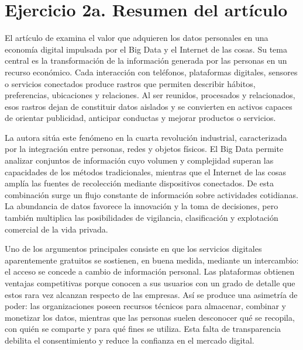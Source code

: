 
\section*{Ejercicio 2a. Resumen del artículo}

El artículo de \citet{datavalue} examina el valor que adquieren los datos
personales en una economía digital impulsada por el Big Data y el Internet de
las cosas. Su tema central es la transformación de la información generada por
las personas en un recurso económico. Cada interacción con teléfonos,
plataformas digitales, sensores o servicios conectados produce rastros que
permiten describir hábitos, preferencias, ubicaciones y relaciones. Al ser
reunidos, procesados y relacionados, esos rastros dejan de constituir datos
aislados y se convierten en activos capaces de orientar publicidad, anticipar
conductas y mejorar productos o servicios.

La autora sitúa este fenómeno en la cuarta revolución industrial, caracterizada
por la integración entre personas, redes y objetos físicos. El Big Data permite
analizar conjuntos de información cuyo volumen y complejidad superan las
capacidades de los métodos tradicionales, mientras que el Internet de las cosas
amplía las fuentes de recolección mediante dispositivos conectados. De esta
combinación surge un flujo constante de información sobre actividades
cotidianas. La abundancia de datos favorece la innovación y la toma de
decisiones, pero también multiplica las posibilidades de vigilancia,
clasificación y explotación comercial de la vida privada.

Uno de los argumentos principales consiste en que los servicios digitales
aparentemente gratuitos se sostienen, en buena medida, mediante un intercambio:
el acceso se concede a cambio de información personal. Las plataformas obtienen
ventajas competitivas porque conocen a sus usuarios con un grado de detalle que
estos rara vez alcanzan respecto de las empresas. Así se produce una asimetría
de poder: las organizaciones poseen recursos técnicos para almacenar, combinar
y monetizar los datos, mientras que las personas suelen desconocer qué se
recopila, con quién se comparte y para qué fines se utiliza. Esta falta de
transparencia debilita el consentimiento y reduce la confianza en el mercado
digital.

